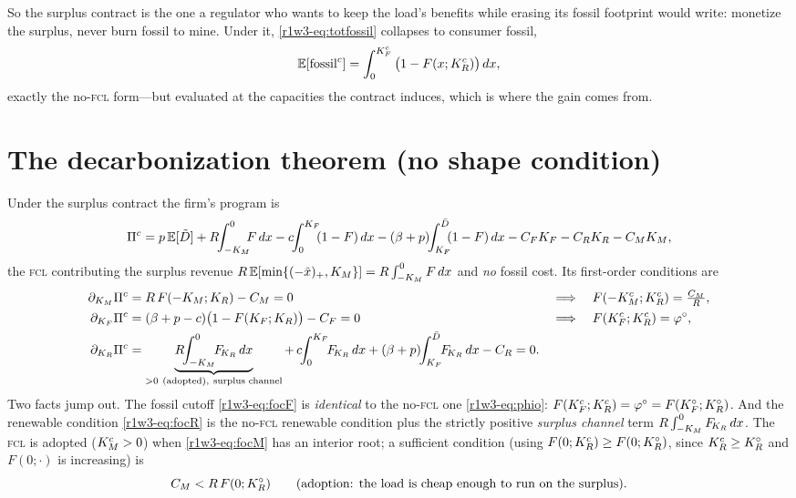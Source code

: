 So the surplus contract is the one a regulator who wants to keep the load's
benefits while erasing its fossil footprint would write: monetize the surplus, never
burn fossil to mine. Under it, \eqref{r1w3-eq:totfossil} collapses to consumer fossil,
\begin{equation}\label{r1w3-eq:fosc}
  \mathbb{E}[\mathrm{fossil}^{c}]=\int_0^{K_F^{c}}\big(1-F(x;K_R^{c})\big)\,dx ,
\end{equation}
exactly the no-\textsc{fcl} form---but evaluated at the capacities the contract
induces, which is where the gain comes from.

\section{The decarbonization theorem (no shape condition)}\label{r1w3-sec:decarb}

Under the surplus contract the firm's program is
\begin{equation}\label{r1w3-eq:Pic}
  \Pi^{c}=p\,\E[\tilde D]
  +R\!\!\int_{-\KM}^{0}\!\!\!F\,dx
  -c\!\!\int_{0}^{\KF}\!\!(1-F)\,dx
  -(\bp)\!\!\int_{\KF}^{\Dbar}\!\!(1-F)\,dx
  -\CF\KF-\CR\KR-\CM\KM ,
\end{equation}
the \textsc{fcl} contributing the surplus revenue $R\,\mathbb{E}[\min\{(-\tilde x)_+,K_M\}]
=R\int_{-K_M}^{0}F\,dx$ and \emph{no} fossil cost. Its first-order conditions are
\begin{align}
  \partial_{\KM}\Pi^{c}&=R\,F(-\KM;\KR)-\CM=0
     &&\Longrightarrow\quad F(-\KMc;\KRc)=\tfrac{\CM}{R},\label{r1w3-eq:focM}\\
  \partial_{\KF}\Pi^{c}&=(\bp-c)\big(1-F(\KF;\KR)\big)-\CF=0
     &&\Longrightarrow\quad F(\KFc;\KRc)=\varphi^{\circ},\label{r1w3-eq:focF}\\
  \partial_{\KR}\Pi^{c}&=\underbrace{R\!\!\int_{-\KM}^{0}\!\!\FKR\,dx}_{>0\ \text{(adopted)},\ \text{surplus channel}}
     +\,c\!\!\int_{0}^{\KF}\!\!\FKR\,dx+(\bp)\!\!\int_{\KF}^{\Dbar}\!\!\FKR\,dx-\CR=0.\label{r1w3-eq:focR}
\end{align}
Two facts jump out. The fossil cutoff \eqref{r1w3-eq:focF} is \emph{identical} to the
no-\textsc{fcl} one \eqref{r1w3-eq:phio}: $F(K_F^{c};K_R^{c})=\varphi^{\circ}=F(K_F^{\circ};K_R^{\circ})$. And
the renewable condition \eqref{r1w3-eq:focR} is the no-\textsc{fcl} renewable condition plus
the strictly positive \emph{surplus channel} term $R\int_{-K_M}^{0}F_{\!K_R}\,dx$. The
\textsc{fcl} is adopted ($K_M^{c}>0$) when \eqref{r1w3-eq:focM} has an interior root; a
sufficient condition (using $F(0;K_R^{c})\ge F(0;K_R^{\circ})$, since $K_R^{c}\ge K_R^{\circ}$ and $F(0;\cdot)$
is increasing) is
\begin{equation}\label{r1w3-eq:adopt}
  C_M<R\,F(0;K_R^{\circ})\qquad\text{(adoption: the load is cheap enough to run on the surplus).}
\end{equation}

